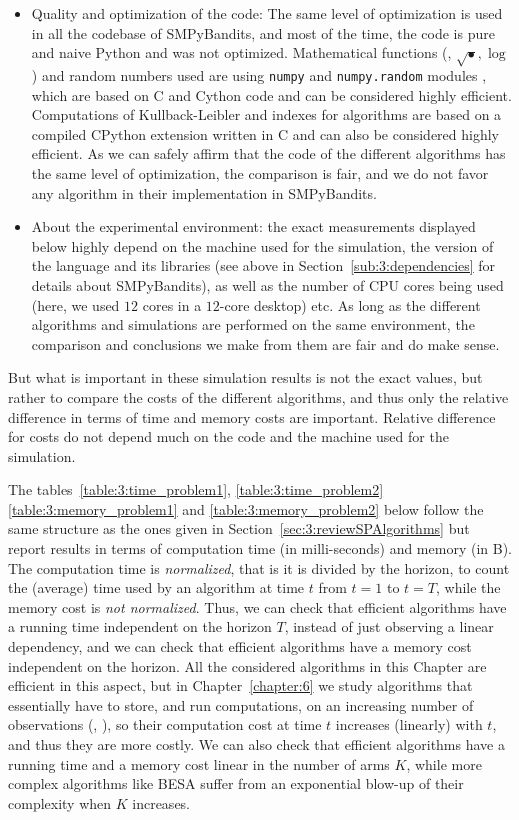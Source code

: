 \begin{itemize}
    \item Quality and optimization of the code:
    The same level of optimization is used in all the codebase of SMPyBandits, and most of the time, the code is pure and naive Python and was not optimized.
    Mathematical functions (\eg, $\sqrt{\bullet}, \log$) and random numbers used are using \texttt{numpy} and \texttt{numpy.random} modules \cite{numpy}, which are based on C and Cython code and can be considered highly efficient.
    Computations of Kullback-Leibler and indexes for \klUCB{} algorithms are based on a compiled CPython extension written in C and can also be considered highly efficient.
    As we can safely affirm that the code of the different algorithms has the same level of optimization, the comparison is fair, and we do not favor any algorithm in their implementation in SMPyBandits.

    \item About the experimental environment:
    the exact measurements displayed below highly depend on the machine used for the simulation, the version of the language and its libraries (see above in Section~\ref{sub:3:dependencies} for details about SMPyBandits), as well as the number of CPU cores being used (here, we used $12$ cores in a $12$-core desktop) etc.
    As long as the different algorithms and simulations are performed on the same environment, the comparison and conclusions we make from them are fair and do make sense.
\end{itemize}

But what is important in these simulation results is not the exact values, but rather to compare the costs of the different algorithms, and thus only the relative difference in terms of time and memory costs are important.
Relative difference for costs do not depend much on the code and the machine used for the simulation.

The tables~\ref{table:3:time_problem1}, \ref{table:3:time_problem2} \ref{table:3:memory_problem1} and \ref{table:3:memory_problem2} below follow the same structure as the ones given in Section~\ref{sec:3:reviewSPAlgorithms} but report results in terms of computation time (in milli-seconds) and memory (in B).
The computation time is \emph{normalized}, that is it is divided by the horizon, to count the (average) time used by an algorithm at time $t$ from $t=1$ to $t=T$, while the memory cost is \emph{not normalized}.
%
Thus, we can check that efficient algorithms have a running time independent on the horizon $T$, instead of just observing a linear dependency, and we can check that efficient algorithms have a memory cost independent on the horizon.
All the considered algorithms in this Chapter are efficient in this aspect, but in Chapter~\ref{chapter:6} we study algorithms that essentially have to store, and run computations, on an increasing number of observations (\eg, \CUSUMUCB), so their computation cost at time $t$ increases (linearly) with $t$, and thus they are more costly.
%
We can also check that efficient algorithms have a running time and a memory cost linear in the number of arms $K$, while more complex algorithms like BESA suffer from an exponential blow-up of their complexity when $K$ increases.

